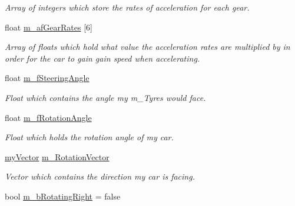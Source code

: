 \begin{DoxyCompactItemize}
\begin{DoxyCompactList}\small\item\em Array of integers which store the rates of acceleration for each gear. \end{DoxyCompactList}\item 
\hypertarget{class_car_a8f521ca3c67a2eb82a8dd2b074f2ef18}{}float \hyperlink{class_car_a8f521ca3c67a2eb82a8dd2b074f2ef18}{m\+\_\+af\+Gear\+Rates} \mbox{[}6\mbox{]}\label{class_car_a8f521ca3c67a2eb82a8dd2b074f2ef18}

\begin{DoxyCompactList}\small\item\em Array of floats which hold what value the acceleration rates are multiplied by in order for the car to gain gain speed when accelerating. \end{DoxyCompactList}\item 
\hypertarget{class_car_aa9a2cb08891629d7b40e9e01e219da21}{}float \hyperlink{class_car_aa9a2cb08891629d7b40e9e01e219da21}{m\+\_\+f\+Steering\+Angle}\label{class_car_aa9a2cb08891629d7b40e9e01e219da21}

\begin{DoxyCompactList}\small\item\em Float which contains the angle my m\+\_\+\+Tyres would face. \end{DoxyCompactList}\item 
\hypertarget{class_car_a982be320c4ff138458a2d9aa6c14ed54}{}float \hyperlink{class_car_a982be320c4ff138458a2d9aa6c14ed54}{m\+\_\+f\+Rotation\+Angle}\label{class_car_a982be320c4ff138458a2d9aa6c14ed54}

\begin{DoxyCompactList}\small\item\em Float which holds the rotation angle of my car. \end{DoxyCompactList}\item 
\hypertarget{class_car_a7c36ad715e5d8047ddb069b29326eebf}{}\hyperlink{classmy_vector}{my\+Vector} \hyperlink{class_car_a7c36ad715e5d8047ddb069b29326eebf}{m\+\_\+\+Rotation\+Vector}\label{class_car_a7c36ad715e5d8047ddb069b29326eebf}

\begin{DoxyCompactList}\small\item\em Vector which contains the direction my car is facing. \end{DoxyCompactList}\item 
\hypertarget{class_car_a50c84c8ca82629d8bf806733b2ed3dcd}{}bool \hyperlink{class_car_a50c84c8ca82629d8bf806733b2ed3dcd}{m\+\_\+b\+Rotating\+Right} = false\label{class_car_a50c84c8ca82629d8bf806733b2ed3dcd}


\end{DoxyCompactItemize}

